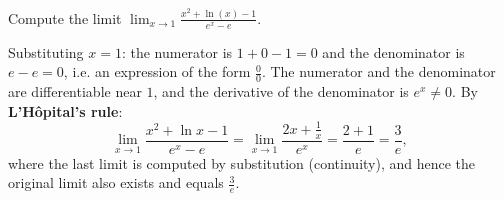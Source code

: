 
\begin{question}
Compute the limit $\displaystyle\lim_{x\to 1}\frac{x^2+\ln(x)-1}{e^x-e}$.
\end{question}

\begin{solution}
Substituting $x=1$: the numerator is $1+0-1=0$ and the denominator is $e-e=0$, i.e. an expression of the form $\frac00$. The numerator and the denominator are differentiable near $1$, and the derivative of the denominator is $e^x\neq 0$. By \textbf{L'Hôpital's rule}:
\[ \lim_{x\to1}\frac{x^2+\ln x-1}{e^x-e}=\lim_{x\to1}\frac{2x+\frac1x}{e^x}=\frac{2+1}{e}=\frac{3}{e}, \]
where the last limit is computed by substitution (continuity), and hence the original limit also exists and equals $\frac{3}{e}$.
\end{solution}

